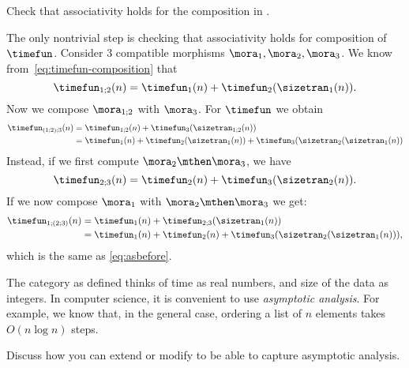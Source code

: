 \begin{exercise}
    Check that associativity holds for the composition in \ProcSizeTime.
\end{exercise}
\begin{solution}
    The only nontrivial step is checking that associativity holds for composition of~$\timefun$.
    Consider 3 compatible morphisms $\mora_1,\mora_2,\mora_3$.
    We know from~\cref{eq:timefun-composition} that
    \begin{equation}
        \timefun_{1;2} (n) = \timefun_1(n) + \timefun_2(\sizetran_1(n)).
    \end{equation}
    Now we compose $\mora_{1;2}$ with $\mora_3$. For $\timefun$ we obtain
    \begin{align}
        \timefun_{(1;2);3}(n)  &=  \timefun_{1;2}(n) + \timefun_3(\sizetran_{1;2}(n)) \\
        & =  \timefun_1(n)
        + \timefun_2(\sizetran_1(n))
        + \timefun_3(\sizetran_2(\sizetran_1(n)) \label{eq:asbefore}
    \end{align}
    Instead, if we first compute $\mora_2\mthen\mora_3$, we have
    \begin{equation}
        \timefun_{2;3} (n) = \timefun_2(n) + \timefun_3(\sizetran_2(n)).
    \end{equation}
    If we now compose $\mora_1$ with $\mora_2\mthen\mora_3$ we get:
    \begin{align}
        \timefun_{1;(2;3)} (n) &= \timefun_1(n) + \timefun_{2;3}(\sizetran_1(n)) \\
        &= \timefun_1(n) + \timefun_2(n) + \timefun_3(\sizetran_2(\sizetran_1(n))),
    \end{align}
    which is the same as \cref{eq:asbefore}.
\end{solution}

\vfill
\begin{gradedexercise}
    The category \ProcSizeTime as defined thinks of time as real numbers, and size of the data as integers.
    In computer science, it is convenient to use \emph{asymptotic analysis}. For example, we know that, in the general case, ordering a list of $n$ elements takes $O(n \log n)$ steps.

    Discuss how you can extend or modify \ProcSizeTime to be able to capture asymptotic analysis.
\end{gradedexercise}

